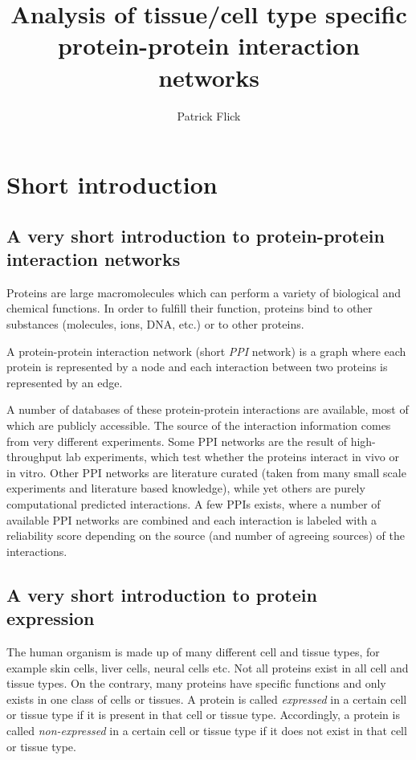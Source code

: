 \documentclass{article}
\title{Analysis of tissue/cell type specific protein-protein interaction networks}
\author{Patrick Flick}
\begin{document}
\maketitle

\section{Short introduction}

\subsection{A very short introduction to protein-protein interaction networks}

Proteins are large macromolecules which can perform a variety of
biological and chemical functions.
In order to fulfill their function, proteins bind to other substances
(molecules, ions, DNA, etc.) or to other proteins.

A protein-protein interaction network (short \emph{PPI} network) is a graph
where each protein is represented by a node and each interaction
between two proteins is represented by an edge. 

A number of databases of these protein-protein interactions are available,
most of which are publicly accessible. The source of the interaction 
information comes from very different experiments. Some PPI networks
are the result of high-throughput lab experiments, which test whether
the proteins interact in vivo or in vitro. Other PPI networks are
literature curated (taken from many small scale experiments and literature
based knowledge), while yet others are purely computational predicted
interactions. A few PPIs exists, where a number of available PPI networks
are combined and each interaction is labeled with a reliability score
depending on the source (and number of agreeing sources) of the
interactions.


\subsection{A very short introduction to protein expression}

The human organism is made up of many different cell and tissue types,
for example skin cells, liver cells, neural cells etc.
Not all proteins exist in all cell and tissue types. On the contrary,
many proteins have specific functions and only exists in one class
of cells or tissues. A protein is called \emph{expressed} in a certain cell
or tissue type if it is present in that cell or tissue type. Accordingly, a
protein is called \emph{non-expressed} in a certain cell or tissue type
if it does not exist in that cell or tissue type.
\end{document}
